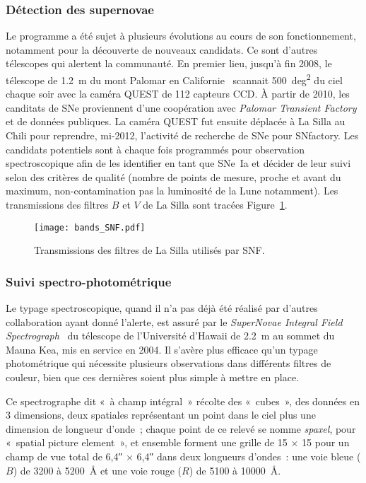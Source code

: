 \documentclass[../main/main.tex]{subfiles}
\begin{document}
\subsubsection{Détection des supernovae}\label{sssec:snfdetec}

Le programme a été sujet à plusieurs évolutions au cours de son fonctionnement,
notamment pour la découverte de nouveaux candidats. Ce sont d'autres télescopes
qui alertent la communauté. En premier lieu, jusqu'à fin 2008, le télescope de
\SI{1,2}{m} du mont Palomar en Californie~\citep{rabinowitz2003} scannait
\SI{500}{deg^2} du ciel chaque soir avec la caméra QUEST de 112 capteurs CCD. À
partir de 2010, les canditats de SNe proviennent d'une coopération avec
\textit{Palomar Transient Factory}~\citep[PTF,][]{law2009} et de données
publiques. La caméra QUEST fut ensuite déplacée à La Silla au Chili
\citep[LSQ,][]{hadjiyska2012} pour reprendre, mi-2012, l'activité de recherche
de SNe pour SNfactory. Les candidats potentiels sont à chaque fois programmés
pour observation spectroscopique afin de les identifier en tant que SNe~Ia et
décider de leur suivi selon des critères de qualité (nombre de points de mesure,
proche et avant du maximum, non-contamination pas la luminosité de la Lune
notamment). Les transmissions des filtres $B$ et $V$ de La Silla sont tracées
Figure~\ref{fig:snfbands}.

\begin{figure}[ht]
    \centering
    \texttt{[image: bands\_SNF.pdf]}
    \captionsetup{justification=centering}
    \caption{Transmissions des filtres de La Silla utilisés par SNF.}
    \label{fig:snfbands}
\end{figure}

\subsubsection{Suivi spectro-photométrique}\label{sssec:snfspectro}

Le typage spectroscopique, quand il n'a pas déjà été réalisé par d'autres
collaboration ayant donné l'alerte, est assuré par le \textit{SuperNovae
Integral Field Spectrograph}~\citep[SNIFS,][]{lantz2004} du télescope de
l'Université d'Hawaii de \SI{2,2}{m} au sommet du Mauna Kea, mis en service en
2004. Il s'avère plus efficace qu'un typage photométrique qui nécessite
plusieurs observations dans différents filtres de couleur, bien que ces
dernières soient plus simple à mettre en place.

Ce spectrographe dit «~à champ intégral~» récolte des «~cubes~», des données en
3 dimensions, deux spatiales représentant un point dans le ciel plus une
dimension de longueur d'onde~; chaque point de ce relevé se nomme
\textit{spaxel}, pour «~spatial picture element~», et ensemble forment une
grille de 15 $\times$ 15 pour un champ de vue total de \ang{;;6,4} $\times$
\ang{;;6,4} dans deux longueurs d'ondes~: une voie bleue ($B$) de 3200 à
\SI{5200}{\angstrom} et une voie rouge ($R$) de 5100 à \SI{10000}{\angstrom}.
\end{document}
